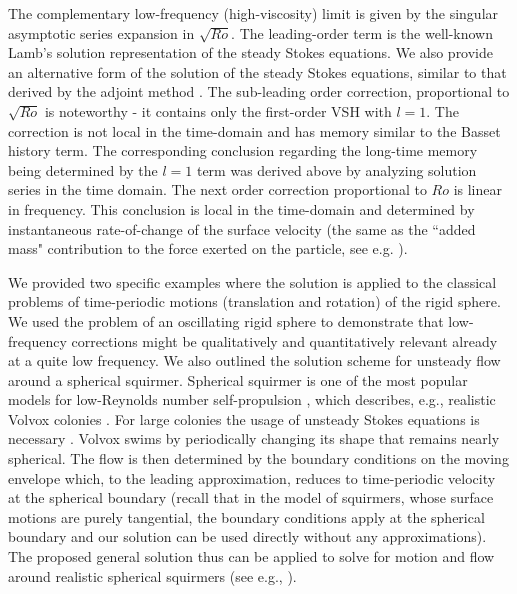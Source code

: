 \documentclass[aps,prx,twocolumn,amsmath,amssymb,amsfonts]{revtex4-2}
\newcommand{\red}[1]{{\color{red}#1}}
\begin{document}
{{The complementary low-frequency (high-viscosity) limit is given by the singular asymptotic series expansion in $\sqrt{Ro}$. The leading-order term is the well-known Lamb's solution representation of the steady Stokes equations. We also provide an alternative form of the solution of the steady Stokes equations, similar to that derived by the adjoint method \cite{kim}. The sub-leading order correction, proportional to $\sqrt{Ro}$ is noteworthy - it contains only the first-order VSH with $l\!=\!1$. The correction is not local in the time-domain and has memory similar to the Basset history term. The corresponding conclusion regarding the long-time memory being determined by the $l=1$ term was derived above by analyzing solution series in the time domain. The next order correction  proportional to $Ro$ is linear in frequency. This conclusion is local in the time-domain and determined by instantaneous rate-of-change of the surface velocity (the same as the ``added mass" contribution to the force exerted on the particle, see e.g. \cite{LL}).

We provided two specific examples where the solution is applied to the classical problems of time-periodic motions (translation and rotation) of the rigid sphere. We used the problem of an oscillating rigid sphere to demonstrate that low-frequency corrections might be qualitatively and quantitatively relevant already at a quite low frequency. We also outlined the solution scheme for unsteady flow around a spherical squirmer.
Spherical squirmer is one of the most popular models for low-Reynolds number self-propulsion \cite{lighthill}, which describes, e.g., realistic Volvox colonies \cite{volvox}. For large colonies the usage of unsteady Stokes equations is necessary \cite{for}. Volvox swims by periodically changing its shape that remains nearly spherical. The flow is then determined by the boundary conditions on the moving envelope which, to the leading approximation, reduces to time-periodic velocity at the spherical boundary (recall that in the model of squirmers, whose surface motions are purely tangential, the boundary conditions apply at the spherical boundary and our solution can be used directly without any approximations). The proposed general solution thus can be applied to solve for motion and flow around realistic spherical squirmers (see e.g., \cite{photo}).

}}
\end{document}
